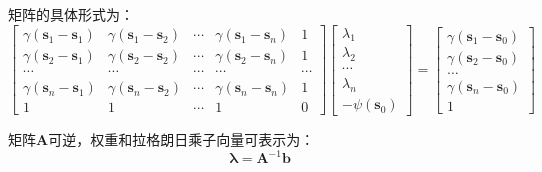 矩阵的具体形式为：
\begin{equation}
    \left[\begin{array}{ccccc}
            \gamma \left( \mathbf{s}_{1} - \mathbf{s}_{1} \right) & \gamma \left( \mathbf{s}_{1} - \mathbf{s}_{2} \right) & \cdots & \gamma \left( \mathbf{s}_{1} - \mathbf{s}_{n} \right) & 1      \\
            \gamma \left( \mathbf{s}_{2} - \mathbf{s}_{1} \right) & \gamma \left( \mathbf{s}_{2} - \mathbf{s}_{2} \right) & \cdots & \gamma \left( \mathbf{s}_{2} - \mathbf{s}_{n} \right) & 1      \\
            \cdots                                                & \cdots                                                & \cdots & \cdots                                                & \cdots \\
            \gamma \left( \mathbf{s}_{n} - \mathbf{s}_{1} \right) & \gamma \left( \mathbf{s}_{n} - \mathbf{s}_{2} \right) & \cdots & \gamma \left( \mathbf{s}_{n} - \mathbf{s}_{n} \right) & 1      \\
            1                                                     & 1                                                     & \cdots & 1                                                     & 0
        \end{array}\right]\left[\begin{array}{c}
            \lambda_{1} \\
            \lambda_{2} \\
            \cdots      \\
            \lambda_{n} \\
            -\psi\left( \mathbf{s}_{0} \right)
        \end{array}\right]=\left[\begin{array}{c}
            \gamma \left( \mathbf{s}_{1} - \mathbf{s}_{0} \right) \\
            \gamma \left( \mathbf{s}_{2} - \mathbf{s}_{0} \right) \\
            \ldots                                                \\
            \gamma \left( \mathbf{s}_{n} - \mathbf{s}_{0} \right) \\
            1
        \end{array}\right]
\end{equation}

矩阵$ \mathbf{A} $可逆，权重和拉格朗日乘子向量可表示为：
\begin{equation}
    \mathbf{\lambda} = \mathbf{A}^{-1} \mathbf{b}
    \label{点克里金方程逆矩阵计算权重}
\end{equation}

